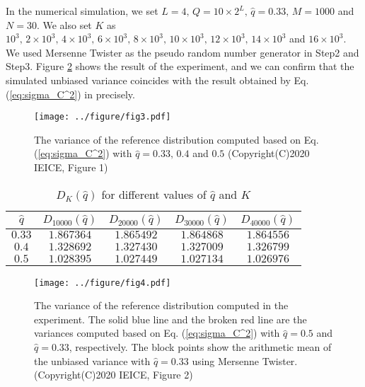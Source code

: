 \documentclass[dvipdfmx,english]{ampmt} %
\begin{document}
%
In the numerical simulation, we set $L=4,\,Q=10\times 2^L,\,\hat{q}=0.33,\, M=1000$ and $N=30$. We also set $K$ as $10^3,\,2\times 10^3 ,\, 4\times 10^3,\, 6\times 10^3,\, 8\times 10^3,\, 10\times 10^3,\,12\times 10^3,\,14\times 10^3$ and $16 \times 10^3$. We used Mersenne Twister as the pseudo random number generator in Step2 and Step3.
Figure \ref{fig:2} shows the result of the experiment, and we can confirm that the simulated unbiased variance coincides with the result obtained by Eq. (\ref{eq:sigma_C^2}) in precisely.
%
%
\begin{figure}[htbp]
  \centering
    \texttt{[image: ../figure/fig3.pdf]}
    \caption{The variance of the reference distribution computed based on Eq. (\ref{eq:sigma_C^2}) with $\hat{q}=0.33,\, 0.4$ and $0.5$ (Copyright(C)2020 IEICE, \cite{hikima2020} Figure 1)}
    \label{fig:1}
\end{figure}
%
\begin{table}[htbp]
  \centering
  \caption{$D_K(\hat{q})$ for different values of $\hat{q}$ and $K$}
  \begin{tabular}{ccccc} \hline
    $\hat{q}$ & $D_{10000}(\hat{q})$ & $D_{20000}(\hat{q})$ & $D_{30000}(\hat{q})$ & $D_{40000}(\hat{q})$  \\ \hline 
    $0.33$    & $1.867364$     & $1.865492$     & $1.864868$     & $1.864556$\\
    $0.4$     & $1.328692$     & $1.327430$     & $1.327009$     & $1.326799$\\
    $0.5$     & $1.028395$     & $1.027449$     & $1.027134$     & $1.026976$\\ \hline
  \end{tabular}
  \label{tab:1}
\end{table}
%
\begin{figure}[htbp]
  \centering
    \texttt{[image: ../figure/fig4.pdf]}
    \caption{The variance of the reference distribution computed in the experiment. The solid blue line and the broken red line are the variances computed based on Eq. (\ref{eq:sigma_C^2}) with $\hat{q}=0.5$ and $\hat{q}=0.33$, respectively. The block points show the arithmetic mean of the unbiased variance with $\hat{q}=0.33$ using Mersenne Twister. (Copyright(C)2020 IEICE, \cite{hikima2020} Figure 2)}
    \label{fig:2}
\end{figure}
%
%
\clearpage
\end{document}
